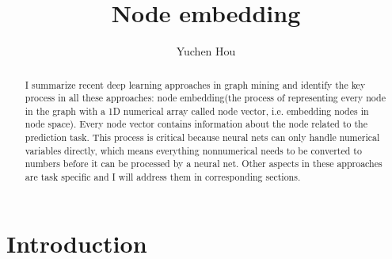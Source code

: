 \documentclass{article}
\begin{document}
\lstset{language=python, tabsize=4}
\title{Node embedding}
\author{Yuchen Hou}
\maketitle

\begin{abstract}
	I summarize recent deep learning approaches in graph mining and identify the key process in all these approaches: node embedding(the process of representing every node in the graph with a 1D numerical array called node vector, i.e. embedding nodes in node space). Every node vector contains information about the node related to the prediction task. This process is critical because neural nets can only handle numerical variables directly, which means everything nonnumerical needs to be converted to numbers before it can be processed by a neural net. Other aspects in these approaches are task specific and I will address them in corresponding sections.
\end{abstract}

\section{Introduction}
\end{document}

